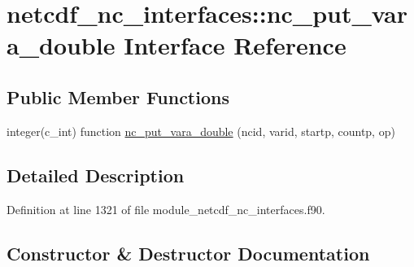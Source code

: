 \hypertarget{interfacenetcdf__nc__interfaces_1_1nc__put__vara__double}{}\section{netcdf\+\_\+nc\+\_\+interfaces\+:\+:nc\+\_\+put\+\_\+vara\+\_\+double Interface Reference}
\label{interfacenetcdf__nc__interfaces_1_1nc__put__vara__double}
\subsection*{Public Member Functions}
\begin{DoxyCompactItemize}
\item 
integer(c\+\_\+int) function \hyperlink{interfacenetcdf__nc__interfaces_1_1nc__put__vara__double_a7a52d5f4e2f9b68afbec95a40b0ed0e1}{nc\+\_\+put\+\_\+vara\+\_\+double} (ncid, varid, startp, countp, op)
\end{DoxyCompactItemize}


\subsection{Detailed Description}


Definition at line 1321 of file module\+\_\+netcdf\+\_\+nc\+\_\+interfaces.\+f90.



\subsection{Constructor \& Destructor Documentation}
\mbox{\label{interfacenetcdf__nc__interfaces_1_1nc__put__vara__double_a7a52d5f4e2f9b68afbec95a40b0ed0e1}} 
